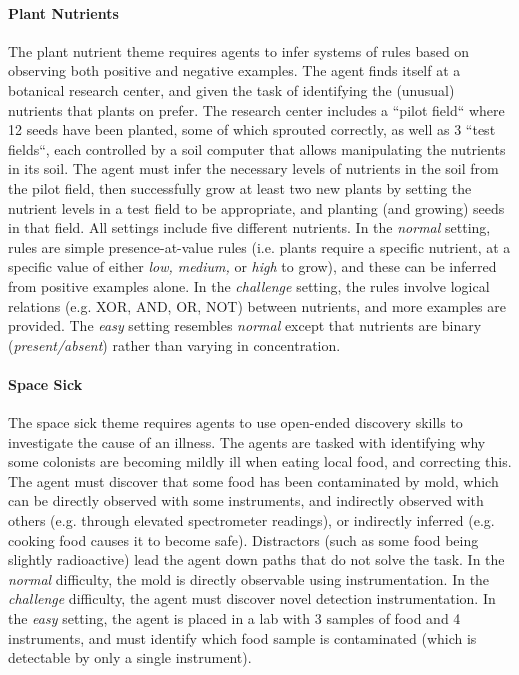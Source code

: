 \paragraph{Plant Nutrients} The plant nutrient theme requires agents to infer systems of rules based on observing both positive and negative examples.  The agent finds itself at a botanical research center, and given the task of identifying the (unusual) nutrients that plants on \planetX prefer.  The research center includes a ``pilot field`` where 12 seeds have been planted, some of which sprouted correctly, as well as 3 ``test fields``, each controlled by a soil computer that allows manipulating the nutrients in its soil.  The agent must infer the necessary levels of nutrients in the soil from the pilot field, then successfully grow at least two new plants by setting the nutrient levels in a test field to be appropriate, and planting (and growing) seeds in that field.  All settings include five different nutrients.  In the \textit{normal} setting, rules are simple presence-at-value rules (i.e. plants require a specific nutrient, at a specific value of either \textit{low, medium,} or \textit{high} to grow), and these can be inferred from positive examples alone.  In the \textit{challenge} setting, the rules involve logical relations (e.g. \textsc{XOR}, \textsc{AND}, \textsc{OR}, \textsc{NOT}) between nutrients, and more examples are provided.  The \textit{easy} setting resembles \textit{normal} except that nutrients are binary (\textit{present/absent}) rather than varying in concentration.

\paragraph{Space Sick} The space sick theme requires agents to use open-ended discovery skills to investigate the cause of an illness.  The agents are tasked with identifying why some colonists are becoming mildly ill when eating local food, and correcting this.  The agent must discover that some food has been contaminated by mold, which can be directly observed with some instruments, and indirectly observed with others (e.g. through elevated spectrometer readings), or indirectly inferred (e.g. cooking food causes it to become safe).  Distractors (such as some food being slightly radioactive) lead the agent down paths that do not solve the task.  In the \textit{normal} difficulty, the mold is directly observable using instrumentation.  In the \textit{challenge} difficulty, the agent must discover novel detection instrumentation.  In the \textit{easy} setting, the agent is placed in a lab with 3 samples of food and 4 instruments, and must identify which food sample is contaminated (which is detectable by only a single instrument). 

